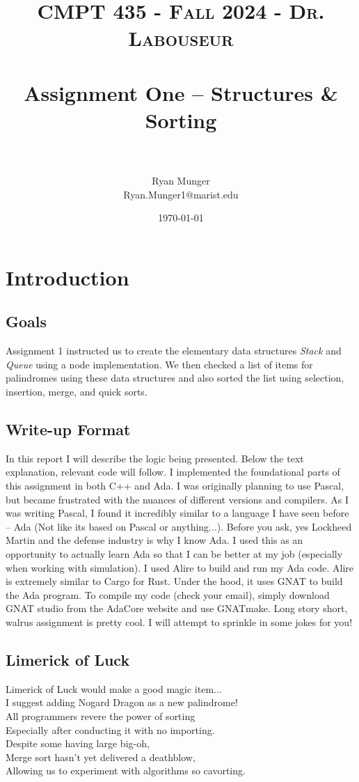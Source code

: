 \documentclass[letterpaper, 10pt]{article}
\title{	
   \normalfont \normalsize 
   \textsc{CMPT 435 - Fall 2024 - Dr. Labouseur} \\[10pt] %
   \horrule{0.5pt} \\[0.25cm] 	%
   \huge Assignment One -- Structures \& Sorting\\     	    %
   \horrule{0.5pt} \\[0.25cm] 	%
}
\author{Ryan Munger \\ \normalsize Ryan.Munger1@marist.edu}
\date{\normalsize\today} 	%
\begin{document}
\maketitle %


\section{Introduction}
\subsection{Goals}
Assignment 1 instructed us to create the elementary data structures \textit{Stack} and \textit{Queue} using a node implementation. We then checked a list of items for palindromes using these data structures and also sorted the list using selection, insertion, merge, and quick sorts.
\subsection{Write-up Format}
    In this report I will describe the logic being presented. Below the text explanation, relevant code will follow. I implemented the foundational parts of this assignment in both C++ and Ada. I was originally planning to use Pascal, but became frustrated with the nuances of different versions and compilers. As I was writing Pascal, I found it incredibly similar to a language I have seen before -- Ada (Not like its based on Pascal or anything...). Before you ask, yes Lockheed Martin and the defense industry is why I know Ada. I used this as an opportunity to actually learn Ada so that I can be better at my job (especially when working with simulation). I used Alire to build and run my Ada code. Alire is extremely similar to Cargo for Rust. Under the hood, it uses GNAT to build the Ada program. To compile my code (check your email), simply download GNAT studio from the AdaCore website and use GNATmake. Long story short, walrus assignment is pretty cool. I will attempt to sprinkle in some jokes for you!
\subsection{Limerick of Luck}
Limerick of Luck would make a good magic item... \\
I suggest adding Nogard Dragon as a new palindrome! \\
\noindent
All programmers revere the power of sorting \\
Especially after conducting it with no importing. \\
    \hspace*{1.5em}Despite some having large big-oh, \\
    \hspace*{1.5em}Merge sort hasn't yet delivered a deathblow, \\
Allowing us to experiment with algorithms so cavorting. \\
\end{document}
